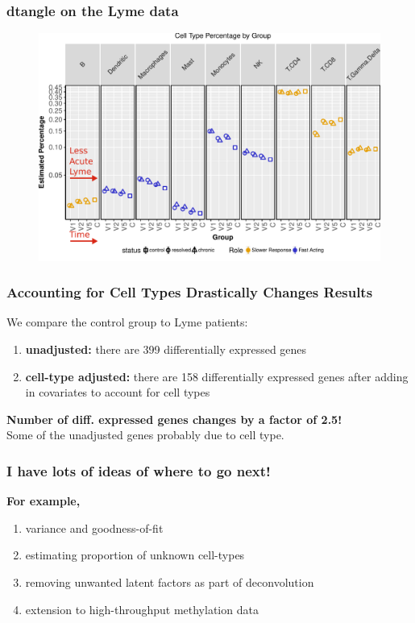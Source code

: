 \documentclass[usenames,dvipsnames,15pt]{beamer}
\renewcommand{\alert}[1]{{\color{NavyBlue} #1}}
\newcommand{\cbo}{\color{BurntOrange}}
\begin{document}
\begin{frame}
  \frametitle{dtangle on the Lyme data}
    \vspace*{-.5cm}\begin{figure}
    \hspace*{-.9cm}\includegraphics[scale=.65]{pictures/ctypes2.pdf}
  \end{figure}
\end{frame}

\begin{frame}
  \frametitle{Accounting for Cell Types Drastically Changes Results}
  We compare the control group to Lyme patients:
  \begin{enumerate}
    \item {\bf unadjusted:} there are {\cbo 399} differentially expressed genes
    \item {\bf cell-type adjusted:} there are {\cbo 158} differentially expressed genes after adding in covariates to account for cell types
  \end{enumerate}

  {\bf Number of diff. expressed genes changes by a factor of 2.5!}\\
  \alert{Some of the unadjusted genes probably due to cell type.}
\end{frame}

\begin{frame}
  \frametitle{I have lots of ideas of where to go next!}
  {\bf For example,}
  \begin{enumerate}
  \item variance and goodness-of-fit 
  \item estimating proportion of unknown cell-types
  \item removing unwanted latent factors as part of deconvolution
  \item extension to high-throughput methylation data
  \end{enumerate}
\end{frame}
\end{document}
